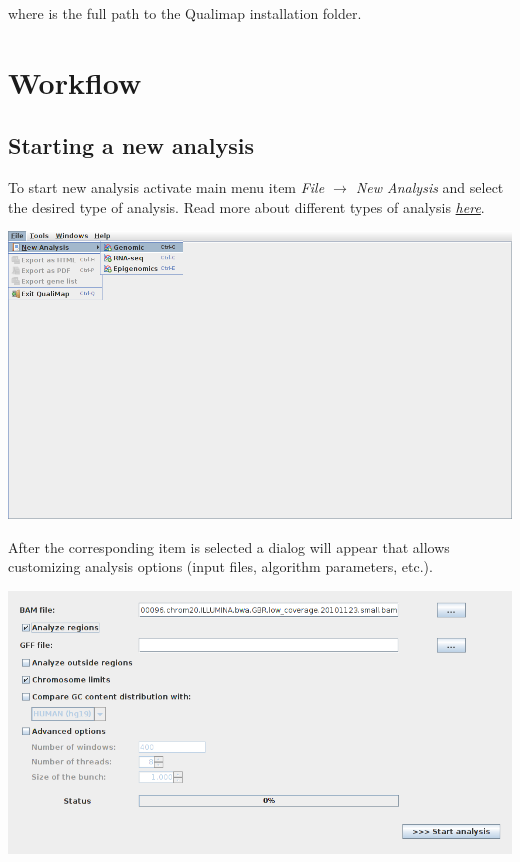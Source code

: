 \documentclass[a4paper,10pt,english]{sphinxmanual}
\begin{document}

where  is the full path to the Qualimap installation folder.


\chapter{Workflow}
\label{workflow:id1}\label{workflow::doc}\label{workflow:workflow}

\section{Starting a new analysis}
\label{workflow:starting-a-new-analysis}
To start new analysis activate main menu item \emph{File \(\rightarrow\) New Analysis} and select the desired type of analysis. Read more about different types of analysis {\hyperref[analysis:analysis-types]{\emph{here}}}.

{\hfill\includegraphics[width=500pt]{start_analysis3.png}\hfill}

After the corresponding item is selected a dialog will appear that allows customizing  analysis options (input  files, algorithm parameters, etc.).

{\hfill\includegraphics[width=500pt]{genomic3.png}\hfill}
\end{document}
